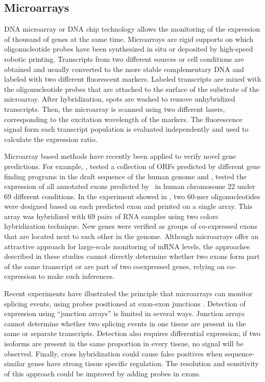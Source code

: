 \subsection{Microarrays}


DNA microarray or DNA chip technology allows the monitoring of the
expression of thousand of genes at the same time. Microarrays are
rigid supports on which oligonucleotide probes have been synthesized
in situ or deposited by high-speed robotic printing. Transcripts from
two different sources or cell conditions are obtained and usually
converted to the more stable complementary DNA and labeled with two
different fluorescent markers. Labeled transcripts are mixed with the
oligonucleotide probes that are attached to the surface of the
substrate of the microarray. After hybridization, spots are washed to
remove unhybridized transcripts. Then, the microarray is scanned using
two different lasers, corresponding to the excitation wavelength of
the markers. The fluorescence signal form each transcript population
is evaluated independently and used to calculate the expression ratio.


Microarray based methods have recently been applied to verify novel
gene predictions. For example, \cite{penn:2000a}, tested a collection
of ORFs predicted by different gene finding programs in the draft
sequence of the human genome and \cite{shoemaker:2001ac}, tested the
expression of all annotated exons predicted by \genscan\ in human
chromosome 22 under 69 different conditions. In the experiment showed
in \cite{shoemaker:2001ac}, two 60-mer oligonucleotides were designed
based on each predicted exon and printed on a single array. This array
was hybridized with 69 pairs of RNA samples using two colors
hybridization technique. New genes were verified as groups of
co-expressed exons that are located next to each other in the
genome. Although microarrays offer an attractive approach for
large-scale monitoring of mRNA levels, the approaches described in
these studies cannot directly determine whether two exons form part of
the same transcript or are part of two coexpressed genes, relying on
co-expression to make such inferences.

Recent experiments have illustrated the principle that microarrays can
monitor splicing events, using probes positioned at exon-exon
junctions \citep{johnson:2003a}. Detection of expression using
``junction arrays'' is limited in several ways. Junction arrays cannot
determine whether two splicing events in one tissue are present in the
same or separate transcripts. Detection also requires differential
expression; if two isoforms are present in the same proportion in
every tissue, no signal will be observed. Finally, cross hybridization
could cause false positives when sequence-similar genes have strong
tissue specific regulation. The resolution and sensitivity of this
approach could be improved by adding probes in exons.



